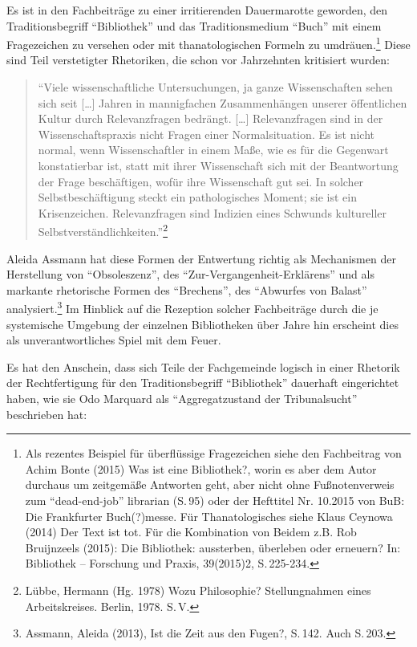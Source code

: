 \documentclass[a4paper,
fontsize=11pt,
oneside,
numbers=noperiodatend,
parskip=half-,
bibliography=totoc,
final
]{scrartcl}
\begin{document}
Es ist in den Fachbeiträge zu einer irritierenden Dauermarotte geworden,
den Traditionsbegriff \enquote{Bibliothek} und das Traditionsmedium
\enquote{Buch} mit einem Fragezeichen zu versehen oder mit
thanatologischen Formeln zu umdräuen.\footnote{Als rezentes Beispiel für
  überflüssige Fragezeichen siehe den Fachbeitrag von Achim Bonte (2015)
  Was ist eine Bibliothek?, worin es aber dem Autor durchaus um
  zeitgemäße Antworten geht, aber nicht ohne Fußnotenverweis zum
  \enquote{dead-end-job} librarian (S.\,95) oder der Hefttitel Nr.
  10.2015 von BuB: Die Frankfurter Buch(?)messe. Für Thanatologisches
  siehe Klaus Ceynowa (2014) Der Text ist tot. Für die Kombination von
  Beidem z.B. Rob Bruijnzeels (2015): Die Bibliothek: aussterben,
  überleben oder erneuern? In: Bibliothek -- Forschung und Praxis,
  39(2015)2, S.\,225-234.} Diese sind Teil verstetigter Rhetoriken, die
schon vor Jahrzehnten kritisiert wurden:

\begin{quote}
\enquote{Viele wissenschaftliche Untersuchungen, ja ganze Wissenschaften
sehen sich seit {[}\ldots{}{]} Jahren in mannigfachen Zusammenhängen
unserer öffentlichen Kultur durch Relevanzfragen bedrängt.
{[}\ldots{}{]} Relevanzfragen sind in der Wissenschaftspraxis nicht
Fragen einer Normalsituation. Es ist nicht normal, wenn Wissenschaftler
in einem Maße, wie es für die Gegenwart konstatierbar ist, statt mit
ihrer Wissenschaft sich mit der Beantwortung der Frage beschäftigen,
wofür ihre Wissenschaft gut sei. In solcher Selbstbeschäftigung steckt
ein pathologisches Moment; sie ist ein Krisenzeichen. Relevanzfragen
sind Indizien eines Schwunds kultureller
Selbstverständlichkeiten.}\footnote{Lübbe, Hermann (Hg. 1978) Wozu
  Philosophie? Stellungnahmen eines Arbeitskreises. Berlin, 1978. S.\,V.}
\end{quote}

Aleida Assmann hat diese Formen der Entwertung richtig als Mechanismen
der Herstellung von \enquote{Obsoleszenz}, des
\enquote{Zur-Vergangenheit-Erklärens} und als markante rhetorische
Formen des \enquote{Brechens}, des \enquote{Abwurfes von Balast}
analysiert.\footnote{Assmann, Aleida (2013), Ist die Zeit aus den
  Fugen?, S.\,142. Auch S.\,203.} Im Hinblick auf die Rezeption solcher
Fachbeiträge durch die je systemische Umgebung der einzelnen
Bibliotheken über Jahre hin erscheint dies als unverantwortliches Spiel
mit dem Feuer.

Es hat den Anschein, dass sich Teile der Fachgemeinde logisch in einer
Rhetorik der Rechtfertigung für den Traditionsbegriff
\enquote{Bibliothek} dauerhaft eingerichtet haben, wie sie Odo Marquard
als \enquote{Aggregatzustand der Tribunalsucht} beschrieben hat:
\end{document}
